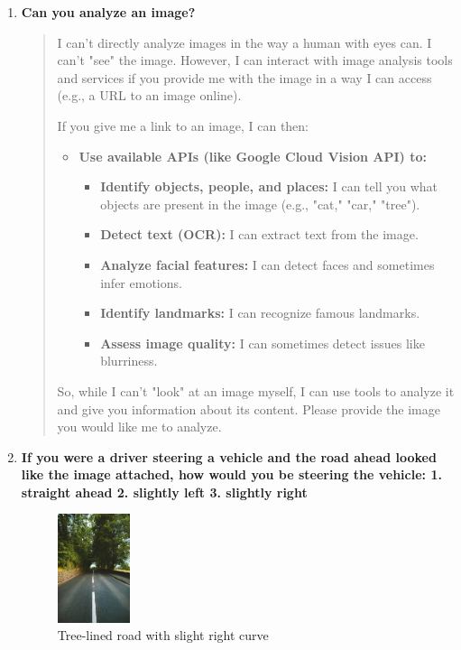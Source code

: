 \begin{enumerate}
    \item \textbf{Can you analyze an image?}
    \begin{quote}
        I can't directly analyze images in the way a human with eyes can. I can't "see" the image. However, I can interact with image analysis tools and services if you provide me with the image in a way I can access (e.g., a URL to an image online).

        If you give me a link to an image, I can then:

        \begin{itemize}
            \item \textbf{Use available APIs (like Google Cloud Vision API) to:}
            \begin{itemize}
                \item \textbf{Identify objects, people, and places:} I can tell you what objects are present in the image (e.g., "cat," "car," "tree").
                \item \textbf{Detect text (OCR):} I can extract text from the image.
                \item \textbf{Analyze facial features:} I can detect faces and sometimes infer emotions.
                \item \textbf{Identify landmarks:} I can recognize famous landmarks.
                \item \textbf{Assess image quality:} I can sometimes detect issues like blurriness.
            \end{itemize}
        \end{itemize}

        So, while I can't "look" at an image myself, I can use tools to analyze it and give you information about its content. Please provide the image you would like me to analyze.
    \end{quote}
    \item \textbf{If you were a driver steering a vehicle and the road ahead looked like the image attached, how would you be steering the vehicle: 1. straight ahead 2. slightly left 3. slightly right}

\begin{figure}[h]
\centering
\includegraphics[width=0.2\textwidth]{Figures/Methods-03-04/tree_tunnel_road.jpeg}
\caption{Tree-lined road with slight right curve}
\label{fig:road1_gemini}
\end{figure}


\end{enumerate}
